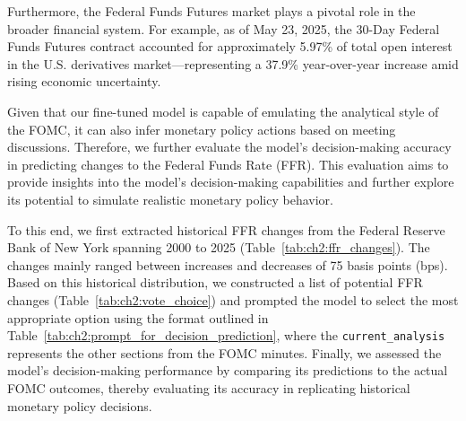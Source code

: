 Furthermore, the Federal Funds Futures market plays a pivotal role in the broader financial system. For example, as of May 23, 2025, the 30-Day Federal Funds Futures contract accounted for approximately 5.97\% of total open interest in the U.S. derivatives market—representing a 37.9\% year-over-year increase amid rising economic uncertainty.

Given that our fine-tuned model is capable of emulating the analytical style of the FOMC, it can also infer monetary policy actions based on meeting discussions. Therefore, we further evaluate the model’s decision-making accuracy in predicting changes to the Federal Funds Rate (FFR). This evaluation aims to provide insights into the model’s decision-making capabilities and further explore its potential to simulate realistic monetary policy behavior.


To this end, we first extracted historical FFR changes from the Federal Reserve Bank of New York spanning 2000 to 2025 (Table~\ref{tab:ch2:ffr_changes}). The changes mainly ranged between increases and decreases of 75 basis points (bps). Based on this historical distribution, we constructed a list of potential FFR changes (Table~\ref{tab:ch2:vote_choice}) and prompted the model to select the most appropriate option using the format outlined in Table~\ref{tab:ch2:prompt_for_decision_prediction}, where the \texttt{current\_analysis} represents the other sections from the FOMC minutes. Finally, we assessed the model’s decision-making performance by comparing its predictions to the actual FOMC outcomes, thereby evaluating its accuracy in replicating historical monetary policy decisions.


